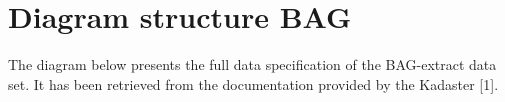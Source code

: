 \chapter{Diagram structure BAG}
\label{chap:DiagramStructureBAG}
The diagram below presents the full data specification of the BAG-extract data set. It has been retrieved from the documentation provided by the Kadaster [1].
